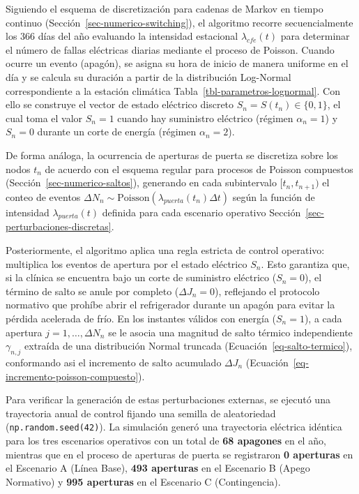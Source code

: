 \documentclass[
  spanish,
  letterpaper,
  DIV=11,
  numbers=noendperiod]{scrreprt}
\theoremstyle{plain}
\theoremstyle{plain}
\theoremstyle{plain}
\theoremstyle{definition}
\theoremstyle{remark}
\begin{document}
Siguiendo el esquema de discretización para cadenas de Markov en tiempo
continuo (Sección~\ref{sec-numerico-switching}), el algoritmo recorre
secuencialmente los 366 días del año evaluando la intensidad estacional
\(\lambda_{cfe}(t)\) para determinar el número de fallas eléctricas
diarias mediante el proceso de Poisson. Cuando ocurre un evento
(apagón), se asigna su hora de inicio de manera uniforme en el día y se
calcula su duración a partir de la distribución Log-Normal
correspondiente a la estación climática
Tabla~\ref{tbl-parametros-lognormal}. Con ello se construye el vector de
estado eléctrico discreto \(S_n = S(t_n) \in \{0, 1\}\), el cual toma el
valor \(S_n = 1\) cuando hay suministro eléctrico (régimen
\(\alpha_n = 1\)) y \(S_n = 0\) durante un corte de energía (régimen
\(\alpha_n = 2\)).

De forma análoga, la ocurrencia de aperturas de puerta se discretiza
sobre los nodos \(t_n\) de acuerdo con el esquema regular para procesos
de Poisson compuestos (Sección~\ref{sec-numerico-saltos}), generando en
cada subintervalo \([t_n, t_{n+1})\) el conteo de eventos
\(\Delta N_n \sim \text{Poisson}(\lambda_{puerta}(t_n)\Delta t)\) según
la función de intensidad \(\lambda_{puerta}(t)\) definida para cada
escenario operativo Sección~\ref{sec-perturbaciones-discretas}.

Posteriormente, el algoritmo aplica una regla estricta de control
operativo: multiplica los eventos de apertura por el estado eléctrico
\(S_n\). Esto garantiza que, si la clínica se encuentra bajo un corte de
suministro eléctrico (\(S_n = 0\)), el término de salto se anule por
completo (\(\Delta J_n = 0\)), reflejando el protocolo normativo que
prohíbe abrir el refrigerador durante un apagón para evitar la pérdida
acelerada de frío. En los instantes válidos con energía (\(S_n = 1\)), a
cada apertura \(j = 1, \dots, \Delta N_n\) se le asocia una magnitud de
salto térmico independiente \(\gamma_{n, j}\) extraída de una
distribución Normal truncada (Ecuación~\ref{eq-salto-termico}),
conformando asi el incremento de salto acumulado \(\Delta J_n\)
(Ecuación~\ref{eq-incremento-poisson-compuesto}).

Para verificar la generación de estas perturbaciones externas, se
ejecutó una trayectoria anual de control fijando una semilla de
aleatoriedad (\texttt{np.random.seed(42)}). La simulación generó una
trayectoria eléctrica idéntica para los tres escenarios operativos con
un total de \textbf{68 apagones} en el año, mientras que en el proceso
de aperturas de puerta se registraron \textbf{0 aperturas} en el
Escenario A (Línea Base), \textbf{493 aperturas} en el Escenario B
(Apego Normativo) y \textbf{995 aperturas} en el Escenario C
(Contingencia).
\end{document}
